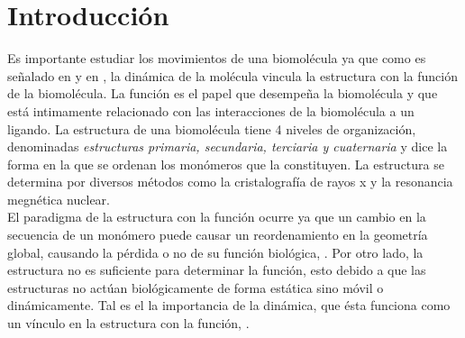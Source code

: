 \chapter*{Introducci\'{o}n}
Es importante estudiar los movimientos de una biomol\'{e}cula ya que como es se\~{n}alado en \cite{Lezon2009} y en  \cite{Rader2006}, la din\'{a}mica de la mol\'{e}cula vincula la estructura con la funci\'{o}n de la biomol\'{e}cula. La funci\'{o}n es el papel que desempe\~{n}a la biomol\'{e}cula y que est\'{a} intimamente relacionado con las interacciones de la biomol\'{e}cula a un ligando. La estructura de una biomol\'{e}cula tiene 4 niveles de organizaci\'{o}n, denominadas \textit{estructuras primaria, secundaria, terciaria y cuaternaria} y dice la forma en la que se ordenan los mon\'{o}meros que la constituyen. La estructura se determina por diversos m\'{e}todos como la cristalograf\'{i}a de rayos x y la resonancia megn\'{e}tica nuclear.\\


El paradigma de la estructura con la funci\'{o}n ocurre ya que un cambio en la secuencia de un mon\'{o}mero puede causar un reordenamiento en la geometr\'{i}a global, causando la p\'{e}rdida o no de su funci\'{o}n biol\'{o}gica, \cite{Dykeman2010NormalPhysics}. Por otro lado, la estructura no es suficiente para determinar la funci\'{o}n, esto debido a que las estructuras no act\'{u}an biol\'{o}gicamente de forma est\'{a}tica sino m\'{o}vil o din\'{a}micamente. Tal es el la importancia de la din\'{a}mica, que \'{e}sta funciona como un v\'{i}nculo en la estructura con la funci\'{o}n, \cite{Bahar2005Coarse-grainedBiology}.\\

 

